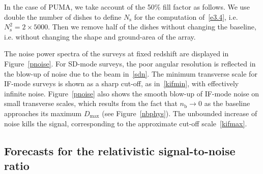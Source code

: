 In the case of PUMA, we take account of the 50\% fill factor as follows. We use double the number of dishes to define $N_\mathrm{s}$ for the computation of~\eqref{e3.4}, i.e. $N_\mathrm{s}^2= 2\times 5000$. Then  we  remove half of the dishes without changing the baseline, i.e. without changing the shape and ground-area of the array.

The noise power spectra of the surveys at fixed redshift are displayed in Figure~\ref{pnoise}. For SD-mode surveys, the poor angular resolution is reflected in the blow-up of noise due to the beam in~\eqref{sdn}.
The minimum transverse scale for IF-mode surveys  is shown as a sharp cut-off, as in~\eqref{kifmin}, with effectively infinite noise.
Figure~\ref{pnoise} also shows the smooth blow-up of IF-mode noise on small transverse scales, which results  from the fact that 
$n_\mathrm{b}\to 0$ as the baseline approaches its maximum $D_\mathrm{max}$ (see Figure~\ref{nbphys}). The unbounded increase of noise kills the signal, corresponding to the approximate cut-off scale~\eqref{kifmax}.

\subsection{Forecasts for the relativistic signal-to-noise ratio}

